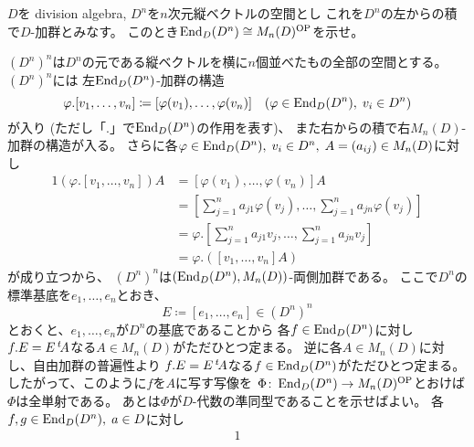 \documentclass[report]{jlreq}
\begin{document}
\begin{problem}[代数学II 4.59]
    $D$を division algebra, $D^n$を$n$次元縦ベクトルの空間とし
    これを$D^n$の左からの積で$D$-加群とみなす。
    このとき$\operatorname{End}_D(D^n) \cong M_n(D)^{\mathrm{OP}}$を示せ。
\end{problem}

\begin{answer}

    $(D^n)^n$は$D^n$の元である縦ベクトルを横に$n$個並べたもの全部の空間とする。
    $(D^n)^n$には
    左$\operatorname{End}_D(D^n)$-加群の構造
    \begin{equation}
        \varphi . [v_1, \dots, v_n]
            \coloneqq [\varphi(v_1), \dots, \varphi(v_n)]
            \quad
            (\varphi \in \operatorname{End}_D(D^n), \; v_i \in D^n)
    \end{equation}
    が入り (ただし「$.$」で$\operatorname{End}_D(D^n)$の作用を表す)、
    また右からの積で右$M_n(D)$-加群の構造が入る。
    さらに各$\varphi \in \operatorname{End}_D(D^n), \; v_i \in D^n, \; A = (a_{ij}) \in M_n(D)$に対し
    \begin{alignat}{1}
        (\varphi . [v_1, \dots, v_n]) A
            &= [\varphi(v_1), \dots, \varphi(v_n)] A \\
            &= \left[
                \sum_{j = 1}^n a_{j1} \varphi(v_j), \dots,
                \sum_{j = 1}^n a_{jn} \varphi(v_j)
            \right] \\
            &= \varphi . \left[
                \sum_{j = 1}^n a_{j1} v_j, \dots,
                \sum_{j = 1}^n a_{jn} v_j
            \right] \\
            &= \varphi . ([v_1, \dots, v_n] A)
    \end{alignat}
    が成り立つから、
    $(D^n)^n$は$(\operatorname{End}_D(D^n), M_n(D))$-両側加群である。
    ここで$D^n$の標準基底を$e_1, \dots, e_n$とおき、
    \begin{equation}
        E \coloneqq [e_1, \dots, e_n] \in (D^n)^n
    \end{equation}
    とおくと、$e_1, \dots, e_n$が$D^n$の基底であることから
    各$f \in \operatorname{End}_D(D^n)$に対し
    $f . E = E \,{}^{t}\!A$なる$A \in M_n(D)$がただひとつ定まる。
    逆に各$A \in M_n(D)$に対し、自由加群の普遍性より
    $f . E = E \,{}^{t}\!A$なる$f \in \operatorname{End}_D(D^n)$がただひとつ定まる。
    したがって、このように$f$を$A$に写す写像を
    $\Phi \colon \operatorname{End}_D(D^n) \to M_n(D)^{\mathrm{OP}}$とおけば$\Phi$は全単射である。
    あとは$\Phi$が$D$-代数の準同型であることを示せばよい。
    各$f, g \in \operatorname{End}_D(D^n), \; a \in D$に対し
    \begin{alignat}{1}

\end{alignat}
\end{answer}
\end{document}
